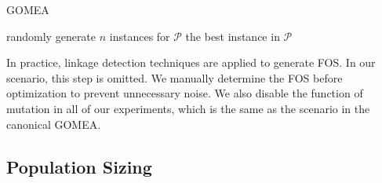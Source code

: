 \documentclass{sig-alternate}
\begin{document}
\begin{algorithm}[h]
{}
\DontPrintSemicolon
\caption{GOMEA}
\label{alg:OMEA}
\BlankLine
randomly generate $n$ instances for $\mathcal P$\;
\Return the best instance in $\mathcal P$
\end{algorithm}

In practice, linkage detection techniques are applied to generate FOS.
In our scenario, this step is omitted.
We manually determine the FOS before optimization to prevent unnecessary noise.
We also disable the function of mutation in all of our experiments,
which is the same as the scenario in the canonical GOMEA.


\subsection{Population Sizing}
\end{document}
